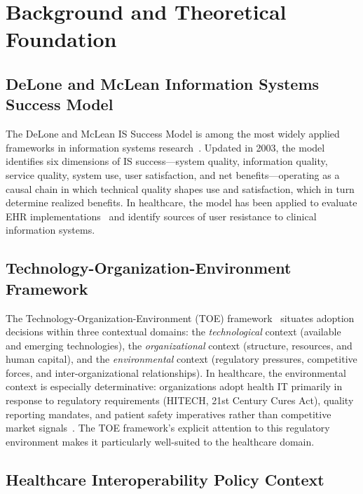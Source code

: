 \section{Background and Theoretical Foundation}

\subsection{DeLone and McLean Information Systems Success Model}

The DeLone and McLean IS Success Model is among the most widely applied frameworks in information systems research~\cite{delone2003model}. Updated in 2003, the model identifies six dimensions of IS success—system quality, information quality, service quality, system use, user satisfaction, and net benefits—operating as a causal chain in which technical quality shapes use and satisfaction, which in turn determine realized benefits. In healthcare, the model has been applied to evaluate EHR implementations~\cite{bossen2013evaluation} and identify sources of user resistance to clinical information systems.

\subsection{Technology-Organization-Environment Framework}

The Technology-Organization-Environment (TOE) framework~\cite{tornatzky1990processes} situates adoption decisions within three contextual domains: the \textit{technological} context (available and emerging technologies), the \textit{organizational} context (structure, resources, and human capital), and the \textit{environmental} context (regulatory pressures, competitive forces, and inter-organizational relationships). In healthcare, the environmental context is especially determinative: organizations adopt health IT primarily in response to regulatory requirements (HITECH, 21st Century Cures Act), quality reporting mandates, and patient safety imperatives rather than competitive market signals~\cite{holmgren2023policyhie,fennelly2020national}. The TOE framework's explicit attention to this regulatory environment makes it particularly well-suited to the healthcare domain.

\subsection{Healthcare Interoperability Policy Context}

